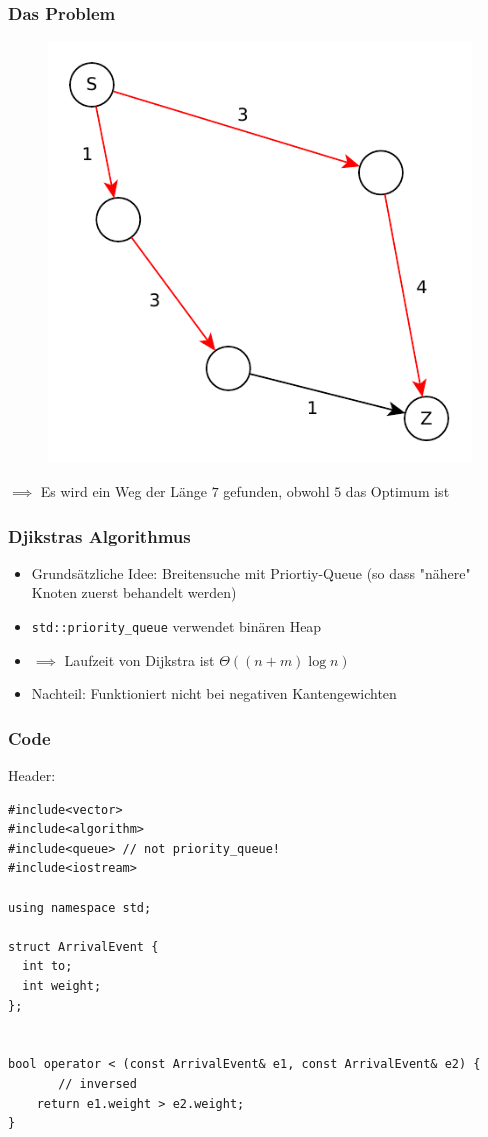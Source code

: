 \begin{frame}
\frametitle{Das Problem}
\begin{figure}
\includegraphics[scale=.8]{dijkstra_graphs/bfs_fail_4.pdf}
\end{figure}

$\implies$ Es wird ein Weg der Länge $7$ gefunden, obwohl $5$ das Optimum ist

\end{frame}


\begin{frame}
\frametitle{Djikstras Algorithmus}
\begin{itemize}
\item Grundsätzliche Idee: Breitensuche mit Priortiy-Queue (so dass "nähere" Knoten zuerst behandelt werden)
\item \lstinline|std::priority_queue| verwendet binären Heap
\item $\implies$ Laufzeit von Dijkstra ist $\Theta((n + m) \log n)$
\item Nachteil: Funktioniert nicht bei negativen Kantengewichten
\end{itemize}
\end{frame}

\begin{frame}[fragile]
\frametitle{Code}
Header: 
\begin{lstlisting}[basicstyle=\tiny]
#include<vector>
#include<algorithm>
#include<queue> // not priority_queue!
#include<iostream>

using namespace std;

struct ArrivalEvent {
  int to;
  int weight;
};


bool operator < (const ArrivalEvent& e1, const ArrivalEvent& e2) {
	   // inversed
    return e1.weight > e2.weight;
}
\end{lstlisting}

\end{frame}

